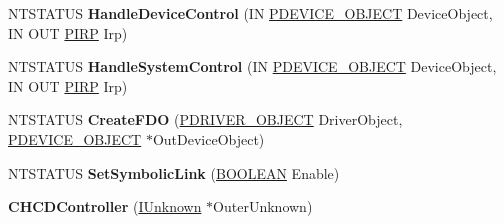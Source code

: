 \begin{DoxyCompactItemize}
N\+T\+S\+T\+A\+T\+US {\bfseries Handle\+Device\+Control} (IN \hyperlink{struct___d_e_v_i_c_e___o_b_j_e_c_t}{P\+D\+E\+V\+I\+C\+E\+\_\+\+O\+B\+J\+E\+CT} Device\+Object, IN O\+UT \hyperlink{interfacevoid}{P\+I\+RP} Irp)
\item 
\mbox{\label{class_c_h_c_d_controller_a71642b217bcbe0a91cec681ccbb11f37}} 
N\+T\+S\+T\+A\+T\+US {\bfseries Handle\+System\+Control} (IN \hyperlink{struct___d_e_v_i_c_e___o_b_j_e_c_t}{P\+D\+E\+V\+I\+C\+E\+\_\+\+O\+B\+J\+E\+CT} Device\+Object, IN O\+UT \hyperlink{interfacevoid}{P\+I\+RP} Irp)
\item 
\mbox{\label{class_c_h_c_d_controller_a38a7c140a575dbc7dc2a1143d6c47328}} 
N\+T\+S\+T\+A\+T\+US {\bfseries Create\+F\+DO} (\hyperlink{struct___d_r_i_v_e_r___o_b_j_e_c_t}{P\+D\+R\+I\+V\+E\+R\+\_\+\+O\+B\+J\+E\+CT} Driver\+Object, \hyperlink{struct___d_e_v_i_c_e___o_b_j_e_c_t}{P\+D\+E\+V\+I\+C\+E\+\_\+\+O\+B\+J\+E\+CT} $\ast$Out\+Device\+Object)
\item 
\mbox{\label{class_c_h_c_d_controller_aa013bc4351c779134dbb1faef86e44b1}} 
N\+T\+S\+T\+A\+T\+US {\bfseries Set\+Symbolic\+Link} (\hyperlink{_processor_bind_8h_a112e3146cb38b6ee95e64d85842e380a}{B\+O\+O\+L\+E\+AN} Enable)
\item 
\mbox{\label{class_c_h_c_d_controller_a535da7c680d9d4c68c3ad79d91e0e5f5}} 
{\bfseries C\+H\+C\+D\+Controller} (\hyperlink{interface_i_unknown}{I\+Unknown} $\ast$Outer\+Unknown)
\end{DoxyCompactItemize}
